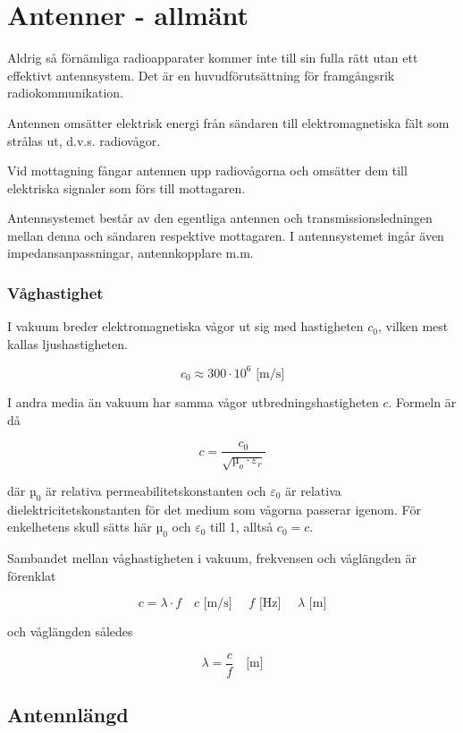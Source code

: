 \section{Antenner - allmänt}

Aldrig så förnämliga radioapparater kommer inte till sin fulla rätt
utan ett effektivt antennsystem. Det är en huvudförutsättning för
framgångsrik radiokommunikation.

Antennen omsätter elektrisk energi från sändaren till
elektromagnetiska fält som strålas ut, d.v.s. radiovågor.

Vid mottagning fångar antennen upp radiovågorna och omsätter dem till
elektriska signaler som förs till mottagaren.

Antennsystemet består av den egentliga antennen och
transmissionsledningen mellan denna och sändaren respektive
mottagaren. I antennsystemet ingår även impedansanpassningar,
antennkopplare m.m.


\subsubsection{Våghastighet}
\label{ljushastigheten}

I vakuum breder elektromagnetiska vågor ut sig med hastigheten
\(c_0\), vilken mest kallas ljushastigheten.

\[c_0 \approx 300 \cdot 10^6 \text{ [m/s]}\]

I andra media än vakuum har samma vågor utbredningshastigheten
\(c\). Formeln är då

\[c = \frac{c_0}{\sqrt{µ_o \cdot \varepsilon_r}}\]

där \(µ_0\) är relativa permeabilitetskonstanten och \(\varepsilon_0\)
är relativa dielektricitetskonstanten för det medium som vågorna
passerar igenom.  För enkelhetens skull sätts här \(µ_0\) och
\(\varepsilon_0\) till 1, alltså \(c_0 = c\).

Sambandet mellan våghastigheten i vakuum, frekvensen och våglängden är förenklat

\[ c = \lambda \cdot f \quad c\text{ [m/s] }\quad f\text{ [Hz] } \quad \lambda\text{ [m]}\]

och våglängden således

\[ \lambda = \frac{c}{f} \quad \text{[m]} \]

\subsection{Antennlängd}


